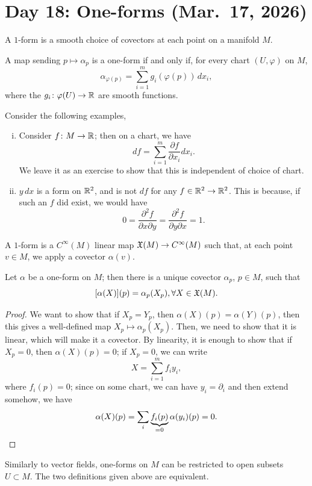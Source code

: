 \section{Day 18: One-forms (Mar.\ 17, 2026)}
A $1$-form is a smooth choice of covectors at each point on a manifold $M$.
\begin{definition}
    A map sending $p \mapsto \alpha_p$ is a one-form if and only if, for every chart $(U, \varphi)$ on $M$,
    \[ \alpha_{\varphi(p)} = \sum_{i=1}^m g_i(\varphi(p)) \, dx_i, \]
    where the $g_i \colon \varphi(U) \to \mathbb R$ are smooth functions.
\end{definition}
Consider the following examples,
\begin{enumerate}[(i)]
    \item Consider $f \colon M \to \mathbb R$; then on a chart, we have
    \[ df = \sum_{i=1}^m \frac{\partial f}{\partial x_i} dx_i. \]
    We leave it as an exercise to show that this is independent of choice of chart.
    \item $y \, dx$ is a form on $\mathbb R^2$, and is not $df$ for any $f \in \mathbb R^2 \to \mathbb R^2$. This is because, if such an $f$ did exist, we would have
    \[ 0 = \frac{\partial^2 f}{\partial x \partial y} = \frac{\partial^2 f}{\partial y \partial x} = 1. \]
\end{enumerate}
\begin{definition}[Functional]
    A $1$-form is a $C^\infty(M)$ linear map $\mathfrak X(M) \to C^\infty(M)$ such that, at each point $v \in M$, we apply a covector $\alpha(v)$.
\end{definition}
\begin{proposition}
    Let $\alpha$ be a one-form on $M$; then there is a unique covector $\alpha_p$, $p \in M$, such that
    \[ [\alpha(X)](p) = \alpha_p(X_p), \forall X \in \mathfrak X(M). \]
\end{proposition}
\begin{proof}
    We want to show that if $X_p = Y_p$, then $\alpha(X)(p) = \alpha(Y)(p)$, then this gives a well-defined map $X_p \mapsto \alpha_p(X_p)$. Then, we need to show that it is linear, which will make it a covector. By linearity, it is enough to show that if $X_p = 0$, then $\alpha(X)(p) = 0$; if $X_p = 0$, we can write
    \[ X = \sum_{i=1}^m f_i y_i, \]
    where $f_i(p) = 0$; since on some chart, we can have $y_i = \partial_i$ and then extend somehow, we have
    \[ \alpha(X)(p) = \sum_i \underbrace{f_i(p)}_{=0} \alpha(y_i)(p) = 0. \qedhere \]
\end{proof}
\begin{proposition}[\S7.10]
    Similarly to vector fields, one-forms on $M$ can be restricted to  open subsets $U \subset M$. The two definitions given above are equivalent.
\end{proposition}
